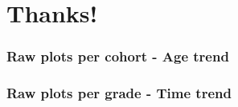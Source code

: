 \documentclass{beamer}
\begin{document}
\section{Thanks!}

\begin{frame}
    \label{update_scott}
    \frametitle{Raw plots per cohort - Age trend}
        {
    }
\end{frame}

\begin{frame}
    \label{update_scott}
    \frametitle{Raw plots per grade - Time trend}
        {
    }
\end{frame}
\end{document}
